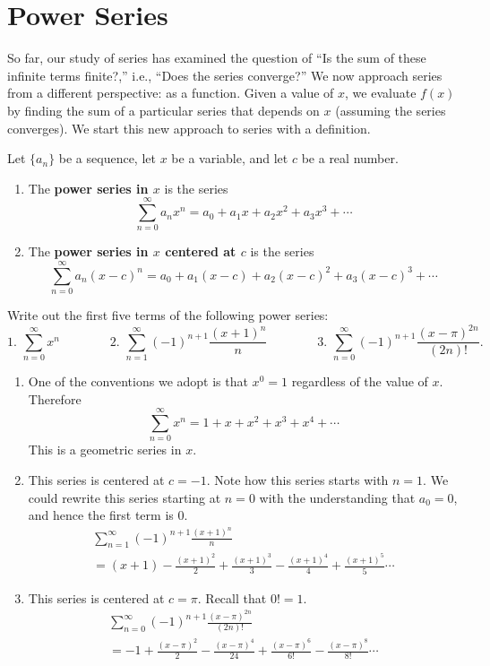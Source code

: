 \section{Power Series}\label{sec:power_series}

So far, our study of series has examined the question of ``Is the sum of these infinite terms finite?,'' i.e., ``Does the series converge?'' We now approach series from a different perspective: as a function. Given a value of $x$, we evaluate $f(x)$ by finding the sum of a particular series that depends on $x$ (assuming the series converges). We start this new approach to series with a definition.

\begin{definition}\label{def:power_series}%
Let $\{a_n\}$ be a sequence, let $x$ be a variable, and let $c$ be a real number.
	\begin{enumerate}
		\item The \textbf{power series in $x$} is the series
		\[\sum_{n=0}^\infty a_nx^n = a_0+a_1x+a_2x^2+a_3x^3+\dotsb\]
		
		\item The \textbf{power series in $x$ centered at $c$} is the series
		\[\sum_{n=0}^\infty a_n(x-c)^n = a_0+a_1(x-c)+a_2(x-c)^2+a_3(x-c)^3+\dotsb\]
	\end{enumerate}
\end{definition}

\begin{example}\label{ex_ps1}%
Write out the first five terms of the following power series:
\[
 \text{1. }\sum_{n=0}^\infty x^n \qquad\qquad
 \text{2. }\sum_{n=1}^\infty (-1)^{n+1}\frac{(x+1)^n}n\qquad\qquad
 \text{3. }\sum_{n=0}^\infty (-1)^{n+1} \frac{(x-\pi)^{2n}}{(2n)!}.
\]
\solution
\begin{enumerate}
	\item One of the conventions we adopt is that $x^0=1$ regardless of the value of $x$. Therefore
	\[\sum_{n=0}^\infty x^n = 1+x+x^2+x^3+x^4+\dotsb\]
	This is a geometric series in $x$.
	
	\item	This series is centered at $c=-1$. Note how this series starts with $n=1$. We could rewrite this series starting at $n=0$ with the understanding that $a_0=0$, and hence the first term is $0$.
	\begin{multline*}
	\sum_{n=1}^\infty (-1)^{n+1}\frac{(x+1)^n}n \\
	= (x+1) - \frac{(x+1)^2}{2} + \frac{(x+1)^3}{3} - \frac{(x+1)^4}{4}+\frac{(x+1)^5}{5}\dotsb
	\end{multline*}
	
	\item	This series is centered at $c=\pi$. Recall that $0!=1$.
	\begin{multline*}
	\sum_{n=0}^\infty (-1)^{n+1} \frac{(x-\pi)^{2n}}{(2n)!}\\
	= -1+\frac{(x-\pi)^2}{2} - \frac{(x-\pi)^4}{24}+ \frac{(x-\pi)^6}{6!}-\frac{(x-\pi)^8}{8!}\dotsb
	\end{multline*}
\end{enumerate}
\end{example}

